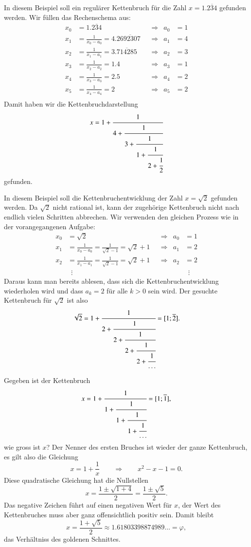 \begin{beispiel}
In diesem Beispiel soll 
ein regulärer Kettenbruch für die Zahl $x=1.\overline{234}$ gefunden werden.
Wir füllen das Rechenschema aus:
\[
\begin{aligned}
x_0&=1.\overline{234}                         &&\Rightarrow& a_0&= 1 \\
x_1&=\frac{1}{x_0-a_0} = 4.2\overline{692307} &&\Rightarrow& a_1&= 4 \\
x_2&=\frac{1}{x_1-a_1} = 3.\overline{714285}  &&\Rightarrow& a_2&= 3 \\
x_3&=\frac{1}{x_2-a_2} = 1.4                  &&\Rightarrow& a_3&= 1 \\
x_4&=\frac{1}{x_3-a_3} = 2.5                  &&\Rightarrow& a_4&= 2 \\
x_5&=\frac{1}{x_4-a_4} = 2                    &&\Rightarrow& a_5&= 2 \\
\end{aligned}
\]
Damit haben wir die Kettenbruchdarstellung 
\[
x=1+\cfrac{1}{
4+\cfrac{1}{
3+\cfrac{1}{
1+\cfrac{1}{
2+\cfrac{1}{
2}}}}}
\]
gefunden.
\end{beispiel}

\begin{beispiel}
In diesem Beispiel soll die Kettenbruchentwicklung der Zahl
$x=\sqrt{2}$ gefunden werden.
Da $\sqrt{2}$ nicht rational ist, kann der zugehörige Kettenbruch
nicht nach endlich vielen Schritten abbrechen.
Wir verwenden den gleichen Prozess wie in der vorangegangenen Aufgabe:
\[
\begin{aligned}
x_0&=\sqrt{2}                                         &&\Rightarrow& a_0 &= 1 \\
x_1&=\frac{1}{x_0-a_0}=\frac{1}{\sqrt{2}-1}=\sqrt{2}+1&&\Rightarrow& a_1 &= 2 \\
x_2&=\frac{1}{x_1-a_1}=\frac{1}{\sqrt{2}-1}=\sqrt{2}+1&&\Rightarrow& a_2 &= 2 \\
   &\phantom{0}\vdots                                 &&           &     &\phantom{0}\vdots
\end{aligned}
\]
Daraus kann man bereits ablesen, dass sich die Kettenbruchentwicklung
wiederholen wird und dass $a_k=2$ für alle $k>0$ sein wird.
Der gesuchte Kettenbruch für $\sqrt{2}$ ist also
\[
\sqrt{2}
=
1+\cfrac{1}{
2+\cfrac{1}{
2+\cfrac{1}{
2+\cfrac{1}{
2+\cfrac{1}{\dots}}}}}
=
[1;\overline{2}].
\]
\end{beispiel}

\begin{beispiel}
Gegeben ist der Kettenbruch
\[
x=1+\cfrac{1}{
1+\cfrac{1}{
1+\cfrac{1}{
1+\cfrac{1}{\dots}}}}
=[1;\overline{1}],
\]
wie gross ist $x$?
Der Nenner des ersten Bruches ist wieder der ganze Kettenbruch, es gilt
also die Gleichung
\[
x = 1+\frac{1}{x}
\qquad\Rightarrow\qquad
x^2-x-1=0.
\]
Diese quadratische Gleichung hat die Nullstellen
\[
x = \frac{1\pm\sqrt{1+4}}2=\frac{1\pm\sqrt{5}}2.
\]
Das negative Zeichen führt auf einen negativen Wert für $x$, der Wert
des Kettenbruches muss aber ganz offensichtlich positiv sein.
Damit bleibt
\[
x=\frac{1+\sqrt{5}}2
\approx
1.61803398874989\ldots=\varphi,
\]
das Verhältniss des goldenen Schnittes.
\end{beispiel}

